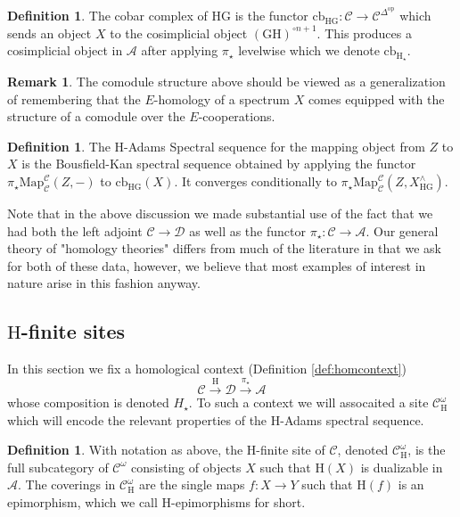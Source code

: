 \documentclass[10pt]{amsart}
\theoremstyle{definition}
\numberwithin{figure}{section}
\numberwithin{equation}{section}
\newtheorem{definition}[figure]{Definition}
\newtheorem{remark}[figure]{Remark}
\newcommand{\op}{\mathrm{op}}
\newcommand{\cA}{\mathcal{A}}
\newcommand{\cC}{\mathcal{C}}
\newcommand{\cD}{\mathcal{D}}
\theoremstyle{cited}
\newcommand{\Map}{\mathrm{Map}}
\newcommand{\cb}{\mathrm{cb}}
\renewcommand{\H}{\mathrm{H}}
\newcommand{\G}{\mathrm{G}}
\begin{document}
\begin{definition}
  The cobar complex of $\H\G$ is the functor $\cb_{\H\G}:\cC\to \cC^{\Delta^\op}$ which sends an object $X$ to the cosimplicial object $(\G\H)^{\circ n+1}$. This produces a cosimplicial object in $\cA$ after applying $\pi_\star$ levelwise which we denote $\cb_{\H_\star}$.
\end{definition}

\begin{remark}
  The comodule structure above should be viewed as a generalization of remembering that the $E$-homology of a spectrum $X$ comes equipped with the structure of a comodule over the $E$-cooperations.
\end{remark}

\begin{definition}
  The $\H$-Adams Spectral sequence for the mapping object from $Z$ to $X$ is the Bousfield-Kan spectral sequence obtained by applying the functor $\pi_\star\Map_{\cC}^{\cC}(Z, -)$ to $\cb_{\H\G}(X)$. It converges conditionally to $\pi_\star\Map_{\cC}^{\cC}(Z,X^\wedge_{\H\G})$.
\end{definition}

Note that in the above discussion we made substantial use of the fact that we had both the left adjoint $\cC\to \cD$ as well as the functor $\pi_\star:\cC\to \cA$. Our general theory of "homology theories" differs from much of the literature in that we ask for both of these data, however, we believe that most examples of interest in nature arise in this fashion anyway.

\subsection{$\H$-finite sites}

In this section we fix a homological context (Definition \ref{def:homcontext})
\[
\cC\xrightarrow{\H} \cD \xrightarrow{\pi_\star} \cA
\]
whose composition is denoted $H_\star$. To such a context we will assocaited a site $\cC_{\H}^\omega$ which will encode the relevant properties of the $\H$-Adams spectral sequence.

\begin{definition}
  With notation as above, the $\H$-finite site of $\cC$, denoted $\cC^{\omega}_{\H}$, is the full subcategory of $\cC^\omega$ consisting of objects $X$ such that $\H(X)$ is dualizable in $\cA$. The coverings in $\cC^\omega_{\H}$ are the single maps $f:X\to Y$ such that $\H(f)$ is an epimorphism, which we call $\H$-epimorphisms for short.
\end{definition}
\end{document}
